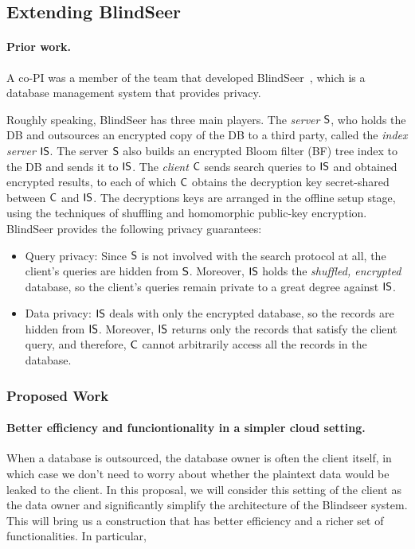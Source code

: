 \subsection{Extending BlindSeer}

\paragraph{Prior work.} A co-PI was a member of the team that developed
BlindSeer~\cite{SP:PKVKMC14,SP:FVKKKM15}, which is a database management system
that provides privacy.

Roughly speaking, BlindSeer has three main players. The {\em server} $\sf S$,
who holds the DB and outsources an encrypted copy of the DB to a third party,
called the {\em index server} $\sf IS$. The server $\sf S$  also builds an
encrypted Bloom filter (BF) tree index to the DB and sends it to $\sf IS$. The
{\em client} $\sf C$ sends search queries to $\sf IS$ and obtained encrypted
results, to each of which $\sf C$ obtains the decryption key secret-shared
between $\sf C$ and $\sf IS$. The decryptions keys are arranged in the offline
setup stage, using the techniques of shuffling and homomorphic public-key
encryption.
%
BlindSeer provides the following privacy guarantees:
\begin{itemize}
\item Query privacy: Since $\sf S$ is not involved with the search protocol at
  all, the client's queries are hidden from $\sf S$. Moreover, $\sf IS$ holds
    the {\em shuffled, encrypted} database, so the client's queries remain
    private to a great degree against $\sf IS$. 

\item Data privacy: $\sf IS$ deals with only the encrypted database, so the
records are hidden from $\sf IS$. Moreover, $\sf IS$ returns only the records
that satisfy the client query, and therefore, $\sf C$ cannot arbitrarily access
all the records in the database.  
\end{itemize}

\subsubsection{Proposed Work}

\paragraph{Better efficiency and funciontionality in a simpler cloud
setting.} When a database is outsourced, the database owner is often the client
itself, in which case we don't need to worry about whether the plaintext data
would be leaked to the client.  In this proposal, we will consider this setting
of the client as the data owner and significantly simplify the architecture of
the Blindseer system. This will bring us a construction that has better
efficiency and a richer set of functionalities. In particular,

